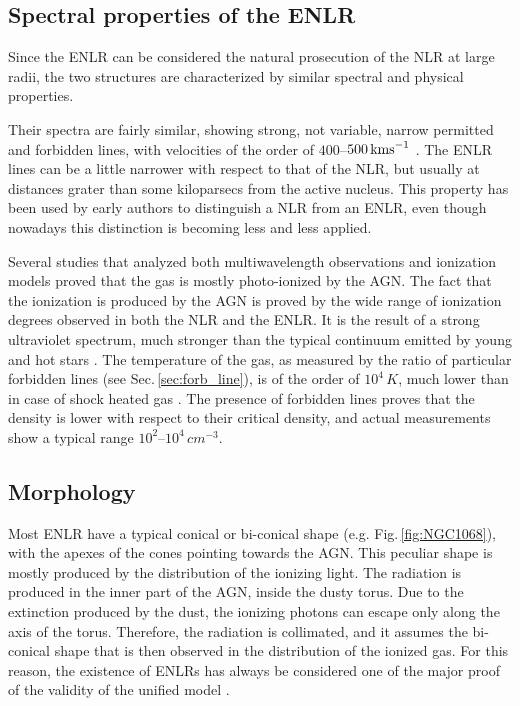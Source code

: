 \documentclass[../main.tex]{subfiles}
\begin{document}
\subsection{Spectral properties of the ENLR}

Since the ENLR can be considered the natural prosecution of the NLR at large radii, the two structures are characterized by similar spectral and physical properties.

Their spectra are fairly similar, showing strong, not variable, narrow permitted and forbidden lines, with velocities of the order of $400$--$500\,\si{\kms}$ \citep{Bennert04}. 
The ENLR lines can be a little narrower with respect to that of the NLR, but usually at distances grater than some kiloparsecs from the active nucleus.
This property has been used by early authors \citep[e.g.][]{Unger87} to distinguish a NLR from an ENLR, even though nowadays this distinction is becoming less and less applied.

Several studies that analyzed both multiwavelength observations and ionization models \citep[e.g.][]{Kraemer00,Kallman01} proved that the gas is mostly photo-ionized by the AGN.
The fact that the ionization is produced by the AGN is proved by the wide range of ionization degrees observed in both the NLR and the ENLR.
It is the result of a strong ultraviolet spectrum, much stronger than the typical continuum emitted by young and hot stars \citep{OsterbrockAGN}.
The temperature of the gas, as measured by the ratio of particular forbidden lines (see Sec.\,\ref{sec:forb_line}), is of the order of $10^4\,\si{K}$, much lower than in case of shock heated gas \citep[$T\sim 5\times10^4$ K][]{OsterbrockAGN}.
The presence of forbidden lines proves that the density is lower with respect to their critical density, and actual measurements show a typical range $10^2$--$10^4\,\si{cm^{-3}}$.

\subsection{Morphology}

Most ENLR have a typical conical or bi-conical shape (e.g. Fig.\,\ref{fig:NGC1068}), with the apexes of the cones pointing towards the AGN.
This peculiar shape is mostly produced by the distribution of the ionizing light.
The radiation is produced in the inner part of the AGN, inside the dusty torus.
Due to the extinction produced by the dust, the ionizing photons can escape only along the axis of the torus.
Therefore, the radiation is collimated, and it assumes the bi-conical shape that is then observed in the distribution of the ionized gas.
For this reason, the existence of ENLRs has always be considered one of the major proof of the validity of the unified model \citep{Wilson94,Schmitt03b,He18}.
\end{document}
